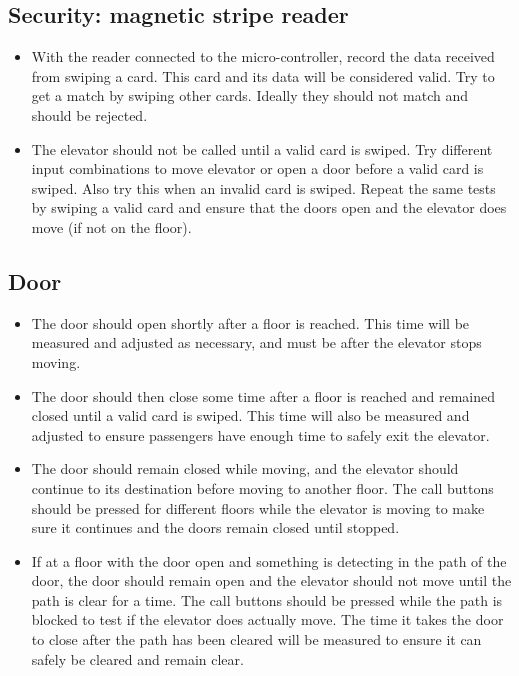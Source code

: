 \documentclass{article}
\begin{document}
	    \subsection{Security: magnetic stripe reader}
	    \begin{itemize}
	        \item With the reader connected to the micro-controller, record the data received from swiping a card. This card and its data will be considered valid. Try to get a match by swiping other cards. Ideally they should not match and should be rejected.
	        \item The elevator should not be called until a valid card is swiped. Try different input combinations to move elevator or open a door before a valid card is swiped. Also try this when an invalid card is swiped. Repeat the same tests by swiping a valid card and ensure that the doors open and the elevator does move (if not on the floor).
	    \end{itemize}
	    
	    \subsection{Door}
	    \begin{itemize}
	        \item The door should open shortly after a floor is reached. This time will be measured and adjusted as necessary, and must be after the elevator stops moving.
	        \item The door should then close some time after a floor is reached and remained closed until a valid card is swiped. This time will also be measured and adjusted to ensure passengers have enough time to safely exit the elevator.
	        \item The door should remain closed while moving, and the elevator should continue to its destination before moving to another floor. The call buttons should be pressed for different floors while the elevator is moving to make sure it continues and the doors remain closed until stopped.
	        \item If at a floor with the door open and something is detecting in the path of the door, the door should remain open and the elevator should not move until the path is clear for a time. The call buttons should be pressed while the path is blocked to test if the elevator does actually move. The time it takes the door to close after the path has been cleared will be measured to ensure it can safely be cleared and remain clear.
	    \end{itemize}
	    
\end{document}
